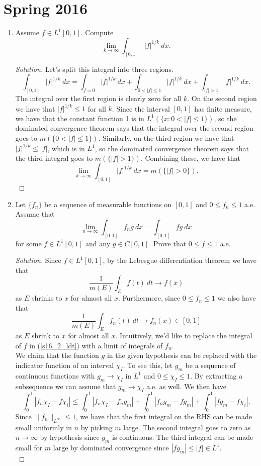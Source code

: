 \documentclass[11pt,letterpaper]{report}
\newenvironment{solution}
{\begin{proof}[Solution]}
{\end{proof}}
\begin{document}
\section{Spring 2016}
\begin{enumerate}
	\item Assume $f\in L^1[0,1]$. Compute
	\[
	\lim_{k\to \infty}\int_{[0,1]}|f|^{1/k}\ dx.
	\]
	\begin{solution}
		Let's split this integral into three regions.
		\[
		\int_{[0,1]}|f|^{1/k}\ dx = \int_{f=0}|f|^{1/k}\ dx + \int_{0<|f|\leq 1}|f|^{1/k}\ dx + \int_{|f|>1}|f|^{1/k}\ dx.
		\]
		The integral over the first region is clearly zero for all $k$. On the second region we have that $|f|^{1/k} \leq 1$ for all $k$. Since the interval $[0,1]$ has finite measure, we have that the constant function 1 is in $L^1(\{x: 0<|f|\leq 1\})$, so the dominated convergence theorem says that the integral over the second region goes to $m(\{0<|f|\leq 1\})$. Similarly, on the third region we have that $|f|^{1/k}\leq |f|$, which is in $L^1$, so the dominated convergence theorem says that the third integral goes to $m(\{|f|>1\})$. Combining these, we have that
		\[
		\lim_{k\to \infty}\int_{[0,1]}|f|^{1/k}\ dx = m(\{|f|>0\}).
		\]
	\end{solution}

	\item Let $\{f_n\}$ be a sequence of measurable functions on $[0,1]$ and $0\leq f_n\leq 1$ a.e. Assume that
	\[
	\lim_{n\to \infty}\int_{[0,1]}f_ng\ dx = \int_{[0,1]}fg\ dx
	\]
	for some $f\in L^1[0,1]$ and any $g\in C[0,1]$. Prove that $0\leq f\leq 1$ a.e.
	\begin{solution}
		Since $f\in L^1[0,1]$, by the Lebesgue differentiation theorem we have that
		\begin{equation}\label{s16_2_ldt}
		\frac{1}{m(E)}\int_Ef(t)\ dt \to f(x)
		\end{equation}
		as $E$ shrinks to $x$ for almost all $x$. Furthermore, since $0\leq f_n\leq 1$ we also have that
		\[
		\frac{1}{m(E)}\int_Ef_n(t)\ dt\to f_n(x)\in [0,1]
		\]
		as $E$ shrink to $x$ for almost all $x$.  Intuitively, we'd like to replace the integral of $f$ in (\ref{s16_2_ldt}) with a limit of integrals of $f_n$.\\

		\noindent We claim that the function $g$ in the given hypothesis can be replaced with the indicator function of an interval $\chi_I$. To see this, let $g_m$ be a sequence of continuous functions with $g_m\to \chi_I$ in $L^1$ and $0\leq \chi_I\leq 1$. By extracting a subsequence we can assume that $g_m\to \chi_I$ a.e. as well. We then have
		\[
		\int_0^1|f_n\chi_I - f\chi_i| \leq \int_0^1|f_n\chi_I-f_ng_m| + \int_0^1|f_ng_m-fg_m| + \int_0^1|fg_m-f\chi_i|.
		\]
		Since $\|f_n\|_{L^\infty}\leq 1$, we have that the first integral on the RHS can be made small uniformly in $n$ by picking $m$ large. The second integral goes to zero as $n\to \infty$ by hypothesis since $g_m$ is continuous. The third integral can be made small for $m$ large by dominated convergence since $|fg_m| \leq |f|\in L^1$.\\


\end{solution}
\end{enumerate}
\end{document}
